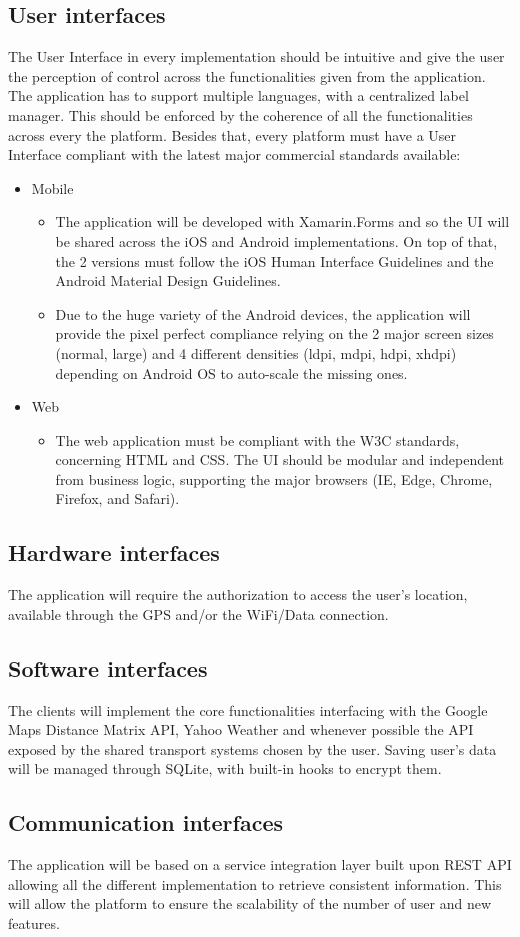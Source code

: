 \subsection{User interfaces}
The User Interface in every implementation should be intuitive and give the user the perception of control across the functionalities given from the application. The application has to support multiple languages, with a centralized label manager. This should be enforced by the coherence of all the functionalities across every the platform. Besides that, every platform must have a User Interface compliant with the latest major commercial standards available:
\begin{itemize}
\item Mobile
\begin{itemize}
\item The application will be developed with Xamarin.Forms and so the UI will be shared across the iOS and Android implementations. On top of that, the 2 versions must follow the iOS Human Interface Guidelines and the Android Material Design Guidelines.
\item Due to the huge variety of the Android devices, the application will provide the pixel perfect compliance relying on the 2 major screen sizes (normal, large) and 4 different densities (ldpi, mdpi, hdpi, xhdpi) depending on Android OS to auto-scale the missing ones.
\end{itemize}

\item Web
\begin{itemize}
\item The web application must be compliant with the W3C standards, concerning HTML and CSS. The UI should be modular and independent from business logic, supporting the major browsers (IE, Edge, Chrome, Firefox, and Safari).
\end{itemize}
\end{itemize}

\subsection{Hardware interfaces}
The application will require the authorization to access the user’s location, available through the GPS and/or the WiFi/Data connection. 

\subsection{Software interfaces}
The clients will implement the core functionalities interfacing with the Google Maps Distance Matrix API, Yahoo Weather and whenever possible the API exposed by the shared transport systems chosen by the user. 
Saving user's data will be managed through SQLite, with built-in hooks to encrypt them.

\subsection{Communication interfaces}
The application will be based on a service integration layer built upon REST API allowing all the different implementation to retrieve consistent information. 
This will allow the platform to ensure the scalability of the number of user and new features.